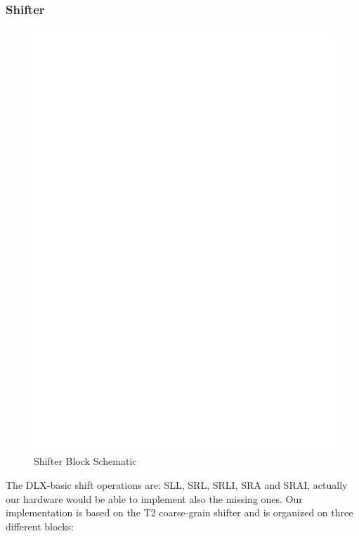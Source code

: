 \documentclass[12pt]{article}
\begin{document}
\subsubsection{Shifter}
\begin{figure}[t]
	\includegraphics[width=\textwidth, center]{images/SHIFTER.eps}
	\caption{Shifter Block Schematic}
	\label{SHIFTER}
\end{figure}
The DLX-basic shift operations are: SLL, SRL, SRLI, SRA and SRAI, actually our hardware would be able to implement also the missing ones.
Our implementation is based on the T2 coarse-grain shifter and is organized on three different blocks:
\end{document}
